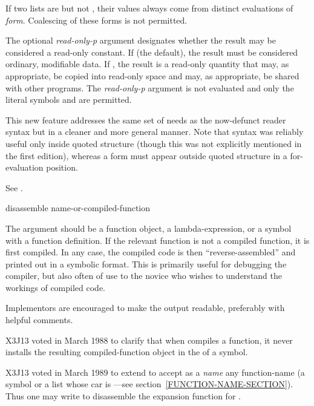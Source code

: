 \begin{newer}
\begin{defspec}
  If two lists  are  but not , their
  values always come from distinct evaluations of {\it form}.  Coalescing
  of these forms is not permitted.

   The optional {\it read-only-p} argument designates whether the result
   may be considered a
   read-only constant. If  (the default), the result must be considered
   ordinary, modifiable data. If , the result is a read-only quantity
   that may, as appropriate, be copied into read-only space and may,
   as appropriate, be shared
   with other programs.  The {\it read-only-p} argument is
   not evaluated and only the literal symbols  and  are permitted.

   This new feature addresses the same set of needs as the now-defunct
   \cd{\#,} reader syntax but in a cleaner and more general manner.
   Note that \cd{\#,} syntax was reliably useful only inside quoted structure
   (though this was not explicitly mentioned in the first edition),
   whereas a  form must appear outside quoted structure in a
   for-evaluation position.

   See .
\end{defspec}
\end{newer}

\begin{defun}[Function]
disassemble name-or-compiled-function

The argument should be a function object, a lambda-expression, or
a symbol with a function definition.  If the relevant function is not a
compiled function, it is first compiled.  In any case, the compiled code
is then ``reverse-assembled'' and printed out in a symbolic format.  This
is primarily useful for debugging the compiler, but also often of use to
the novice who wishes to understand the workings of compiled code.

\beforenoterule
\begin{implementation}
Implementors are encouraged to make the output
readable, preferably with helpful comments.
\end{implementation}
\afternoterule

\begin{newer}
X3J13 voted in March 1988 
to clarify that when  compiles a function, it never
installs the resulting compiled-function object in the
 of a symbol.
\end{newer}

\begin{newer}
X3J13 voted in March 1989  to extend 
to accept as a {\it name} any function-name (a symbol or a list
whose car is ---see section~\ref{FUNCTION-NAME-SECTION}).
Thus one may write  to disassemble the 
expansion function for .
\end{newer}
\end{defun}

